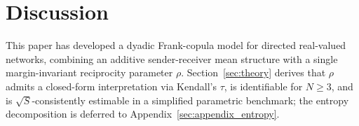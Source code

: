 \documentclass[12pt]{article}
\begin{document}


\section{Discussion}
\label{sec:discuss}

This paper has developed a dyadic Frank-copula model for directed real-valued
networks, combining an additive sender-receiver mean structure with a single
margin-invariant reciprocity parameter $\rho$.  Section~\ref{sec:theory}
derives that $\rho$ admits a closed-form interpretation via Kendall's $\tau$,
is identifiable for $N \geq 3$, and is $\sqrt{S}$-consistently estimable
in a simplified parametric benchmark; the entropy decomposition is deferred
to Appendix~\ref{sec:appendix_entropy}.
\end{document}
